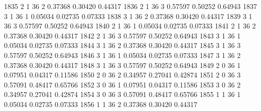 \documentclass{article}
\begin{document}
\begin{Woutput}
1835      2       1      36       2       0.37368    0.30420    0.44317
1836      2       1      36       3       0.57597    0.50252    0.64943
1837      3       1      36       1       0.05034    0.02735    0.07333
1838      3       1      36       2       0.37368    0.30420    0.44317
1839      3       1      36       3       0.57597    0.50252    0.64943
1840      2       1      36       1       0.05034    0.02735    0.07333
1841      2       1      36       2       0.37368    0.30420    0.44317
1842      2       1      36       3       0.57597    0.50252    0.64943
1843      3       1      36       1       0.05034    0.02735    0.07333
1844      3       1      36       2       0.37368    0.30420    0.44317
1845      3       1      36       3       0.57597    0.50252    0.64943
1846      3       1      36       1       0.05034    0.02735    0.07333
1847      3       1      36       2       0.37368    0.30420    0.44317
1848      3       1      36       3       0.57597    0.50252    0.64943
1849      2       0      36       1       0.07951    0.04317    0.11586
1850      2       0      36       2       0.34957    0.27041    0.42874
1851      2       0      36       3       0.57091    0.48417    0.65766
1852      3       0      36       1       0.07951    0.04317    0.11586
1853      3       0      36       2       0.34957    0.27041    0.42874
1854      3       0      36       3       0.57091    0.48417    0.65766
1855      1       1      36       1       0.05034    0.02735    0.07333
1856      1       1      36       2       0.37368    0.30420    0.44317


\end{Woutput}
\end{document}
